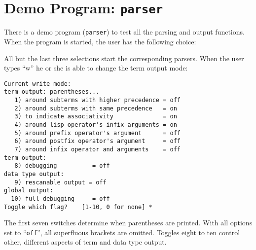 \section{Demo Program: {\tt parser}}

There is a demo program ({\tt parser}) to test all the parsing and
output functions. When the program is started, the user has the following
choice:



All but the last three selections start the corresponding parsers.
When the user types ``w'' he or she is able to change the term output mode:
\begin{verbatim}
Current write mode:
term output: parentheses...
   1) around subterms with higher precedence = off
   2) around subterms with same precedence   = on
   3) to indicate associativity              = on
   4) around lisp-operator's infix arguments = on
   5) around prefix operator's argument      = off
   6) around postfix operator's argument     = off
   7) around infix operator and arguments    = off
term output:
   8) debugging          = off
data type output:
   9) rescanable output = off
global output:
  10) full debugging     = off
Toggle which flag?    [1-10, 0 for none] *
\end{verbatim}

The first seven switches determine when parentheses are printed. With
all options set to ``{\tt off}'', all superfluous brackets are omitted.
Toggles eight to ten control other, different aspects of term and data type
output.

